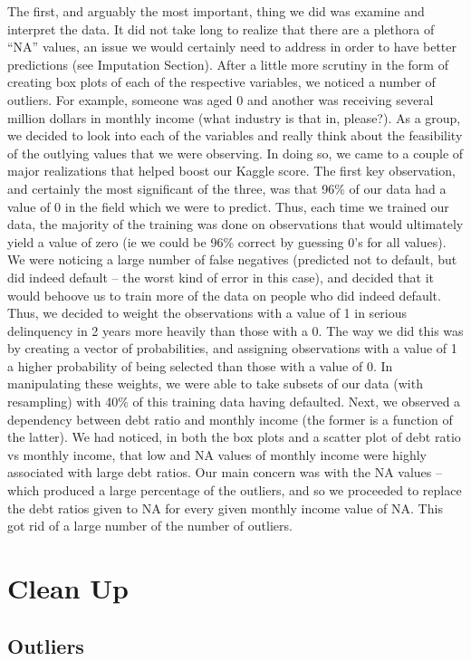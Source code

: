 \documentclass[11pt, oneside]{article}   	%
\begin{document}
The first, and arguably the most important, thing we did was examine and interpret the data. It did not take long to realize that there are a plethora of “NA” values, an issue we would certainly need to address in order to have better predictions (see Imputation Section). After a little more scrutiny in the form of creating box plots of each of the respective variables, we noticed a number of outliers. For example, someone was aged 0 and another was receiving several million dollars in monthly income (what industry is that in, please?). As a group, we decided to look into each of the variables and really think about the feasibility of the outlying values that we were observing. In doing so, we came to a couple of major realizations that helped boost our Kaggle score. 
The first key observation, and certainly the most significant of the three, was that 96\% of our data had a value of 0 in the field which we were to predict. Thus, each time we trained our data, the majority of the training was done on observations that would ultimately yield a value of zero (ie we could be 96\% correct by guessing 0’s for all values). We were noticing a large number of false negatives (predicted not to default, but did indeed default – the worst kind of error in this case), and decided that it would behoove us to train more of the data on people who did indeed default. Thus, we decided to weight the observations with a value of 1 in serious delinquency in 2 years more heavily than those with a 0. The way we did this was by creating a vector of probabilities, and assigning observations with a value of 1 a higher probability of being selected than those with a value of 0. In manipulating these weights, we were able to take subsets of our data (with resampling) with 40\% of this training data having defaulted. 
Next, we observed a dependency between debt ratio and monthly income (the former is a function of the latter). We had noticed, in both the box plots and a scatter plot of debt ratio vs monthly income, that low and NA values of monthly income were highly associated with large debt ratios. Our main concern was with the NA values – which produced a large percentage of the outliers, and so we proceeded to replace the debt ratios given to NA for every given monthly income value of NA. This got rid of a large number of the number of outliers.

\section{Clean Up}
	\subsection{Outliers}
\end{document}
